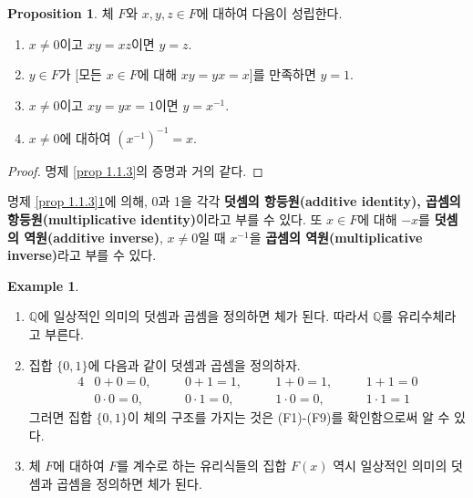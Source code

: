 \documentclass[11pt]{book}
\numberwithin{equation}{chapter}
\def\QQ{\mathbb{Q}}
\theoremstyle{definition}
\newtheorem{prop}[thm]{Proposition}
\newtheorem*{ex}{Example}
\begin{document}
\begin{prop} \label{prop 1.1.4}
    체 \(F\)와 \(x, y, z \in F\)에 대하여 다음이 성립한다.
    \begin{enumerate} [label=(\alph*), leftmargin=2\parindent]
        \item
        \(x \ne 0\)이고 \(xy = xz\)이면 \(y = z\).
        \item
        \(y \in F\)가 [모든 \(x \in F\)에 대해 \(xy = yx = x\)]를 만족하면 \(y = 1\).
        \item
        \(x \ne 0\)이고 \(xy = yx = 1\)이면 \(y = x^{-1}\).
        \item
        \(x \ne 0\)에 대하여 \((x^{-1})^{-1} = x\).
    \end{enumerate}
\end{prop}
\begin{proof}
    명제 \ref{prop 1.1.3}의 증명과 거의 같다.
\end{proof}

명제 \ref{prop 1.1.3}\과 \ref{prop 1.1.4}에 의해, 0과 1을 각각 \textbf{덧셈의 항등원(additive identity), 곱셈의 항등원(multiplicative identity)}이라고 부를 수 있다. 또 \(x \in F\)에 대해 \(-x\)를 \textbf{덧셈의 역원(additive inverse)}, \(x \ne 0\)일 때 \(x^{-1}\)을 \textbf{곱셈의 역원(multiplicative inverse)}라고 부를 수 있다.

\begin{ex}\quad


    \begin{enumerate} [label=(\alph*)]
        \item \(\QQ\)에 일상적인 의미의 덧셈과 곱셈을 정의하면 체가 된다. 따라서 \(\QQ\)를 유리수체라고 부른다. 
        \item 집합 \(\{0, 1\}\)에 다음과 같이 덧셈과 곱셈을 정의하자.
            \begin{alignat*}{4}
                &0 + 0 = 0, \quad &&0 + 1 = 1, \quad &&1 + 0 = 1, \quad&&1 + 1 = 0\\
                &0 \cdot 0 = 0, \quad &&0 \cdot 1 = 0, \quad &&1 \cdot 0 = 0, \quad&&1 \cdot 1 = 1
            \end{alignat*}
            그러면 집합 \(\{0, 1\}\)이 체의 구조를 가지는 것은 (F1)-(F9)를 확인함으로써 알 수 있다.
        \item 체 \(F\)에 대하여 \(F\)를 계수로 하는 유리식들의 집합 \(F(x)\) 역시 일상적인 의미의 덧셈과 곱셈을 정의하면 체가 된다.
    \end{enumerate}
\end{ex}
\end{document}
